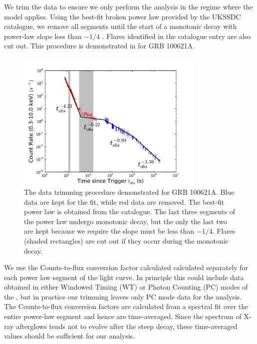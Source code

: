 We trim the \swiftXRT{} data to ensure we only perform the analysis in the regime where the model applies.  Using the best-fit broken power law provided by the UKSSDC \XRT{} catalogue, we remove all segments until the start of a monotonic decay with power-law slope less than $-1/4$ \citep{SWIFTauto}.  Flares identified in the catalogue entry are also cut out.  This procedure is demonstrated in  for GRB 100621A.

\begin{figure}
\begin{center}
 \includegraphics[width=0.8\textwidth]{figures/scalefit/data_trim.pdf}
 \end{center}
	\caption{  The data trimming procedure demonstrated for GRB 100621A.  Blue data are kept for the fit, while red data are removed.  The best-fit power law is obtained from the \swiftXRT{} catalogue.  The last three segments of the power law undergo monotonic decay, but the only the last two are kept because we require the slope must be less than $-1/4$.  Flares (shaded rectangles) are cut out if they occur during the monotonic decay. }
\end{figure}

We use the Counts-to-flux conversion factor calculated calculated separately for each power law segment of the light curve.  In principle this could include data obtained in either Windowed Timing (WT) or Photon Counting (PC) modes of the \swiftXRT{}, but in practice our trimming leaves only PC mode data for the analysis.  The Counts-to-flux conversion factors are calculated from a spectral fit over the entire power-law segment and hence are time-averaged.  Since the spectrum of X-ray afterglows tends not to evolve after the steep decay, these time-averaged values should be sufficient for our analysis. 

